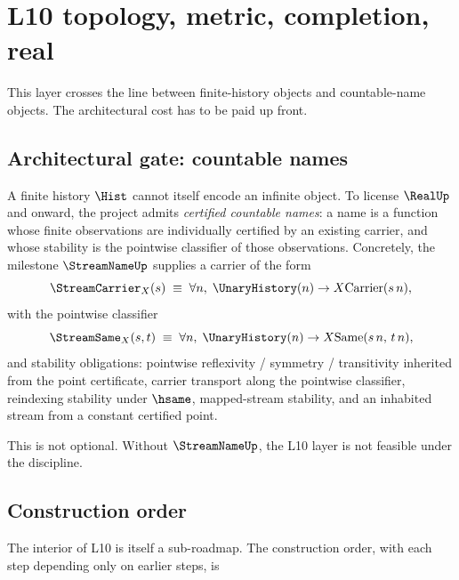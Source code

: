 \section{L10 topology, metric, completion, real}
\label{sec:roadmap-l10-topology-metric-completion-real}

This layer crosses the line between finite-history objects and countable-name objects. The architectural cost has to be paid up front.

\subsection*{Architectural gate: countable names}
\label{sec:roadmap-l10-stream-name}

A finite history $\Hist$ cannot itself encode an infinite object. To license $\RealUp$ and onward, the project admits \emph{certified countable names}: a name is a function whose finite observations are individually certified by an existing carrier, and whose stability is the pointwise classifier of those observations. Concretely, the milestone $\StreamNameUp$ supplies a carrier of the form
$$
\StreamCarrier_X(s) \;\equiv\; \forall n,\; \UnaryHistory(n) \to X{\text{Carrier}}(s\,n),
$$
with the pointwise classifier
$$
\StreamSame_X(s,t) \;\equiv\; \forall n,\; \UnaryHistory(n) \to X{\text{Same}}(s\,n,\,t\,n),
$$
and stability obligations: pointwise reflexivity / symmetry / transitivity inherited from the point certificate, carrier transport along the pointwise classifier, reindexing stability under $\hsame$, mapped-stream stability, and an inhabited stream from a constant certified point.

This is not optional. Without $\StreamNameUp$, the L10 layer is not feasible under the discipline.

\subsection*{Construction order}
\label{sec:roadmap-l10-construction-order}

The interior of L10 is itself a sub-roadmap. The construction order, with each step depending only on earlier steps, is

